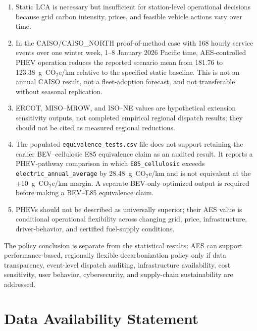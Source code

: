 \documentclass[cleantechnol,article,submit,pdftex,moreauthors]{Definitions/mdpi}
\newcommand{\gcoeqkm}{g~CO$_2$e/km}
\begin{document}
\begin{enumerate}
	\item Static LCA is necessary but insufficient for station-level operational decisions because grid carbon intensity, prices, and feasible vehicle actions vary over time.
	
	\item In the CAISO/CAISO\_NORTH proof-of-method case with 168 hourly service events over one winter week, 1--8 January 2026 Pacific time, AES-controlled PHEV operation reduces the reported scenario mean from 181.76 to 123.38~\gcoeqkm{} relative to the specified static baseline. This is not an annual CAISO result, not a fleet-adoption forecast, and not transferable without seasonal replication.
	
	\item ERCOT, MISO--MROW, and ISO--NE values are hypothetical extension sensitivity outputs, not completed empirical regional dispatch results; they should not be cited as measured regional reductions.
	
	\item The populated \texttt{equivalence\_tests.csv} file does not support retaining the earlier BEV--cellulosic E85 equivalence claim as an audited result. It reports a PHEV-pathway comparison in which \texttt{E85\_cellulosic} exceeds \texttt{electric\_annual\_average} by 28.48~\gcoeqkm{} and is not equivalent at the $\pm10$~\gcoeqkm{} margin. A separate BEV-only optimized output is required before making a BEV--E85 equivalence claim.
	
	\item PHEVs should not be described as universally superior; their AES value is conditional operational flexibility across changing grid, price, infrastructure, driver-behavior, and certified fuel-supply conditions.
\end{enumerate}

The policy conclusion is separate from the statistical results: AES can support performance-based, regionally flexible decarbonization policy only if data transparency, event-level dispatch auditing, infrastructure availability, cost sensitivity, user behavior, cybersecurity, and supply-chain sustainability are addressed.


\section*{Data Availability Statement}
\end{document}
